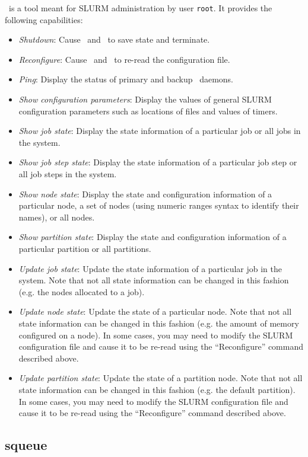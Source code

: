 \documentclass[10pt,onecolumn,times]{../common/llncs}
\begin{document}
{\scontrol\ is a tool meant for SLURM administration by user {\tt root}. 
It provides the following capabilities:
\begin{itemize}
\item {\em Shutdown}: Cause \slurmctld\ and \slurmd\ to save state 
and terminate.
\item {\em Reconfigure}: Cause \slurmctld\ and \slurmd\ to re-read the 
configuration file.
\item {\em Ping}: Display the status of primary and backup \slurmctld\ daemons.
\item {\em Show configuration parameters}: Display the values of general SLURM 
configuration parameters such as locations of files and values of timers.  
\item {\em Show job state}: Display the state information of a particular job 
or all jobs in the system.
\item {\em Show job step state}: Display the state information of a particular 
job step or all job steps in the system.
\item {\em Show node state}: Display the state and configuration information 
of a particular node, a set of nodes (using numeric ranges syntax to 
identify their names), or all nodes.
\item {\em Show partition state}: Display the state and configuration 
information of a particular partition or all partitions.
\item {\em Update job state}: Update the state information of a particular job 
in the system. Note that not all state information can be changed in this 
fashion (e.g. the nodes allocated to a job).
\item {\em Update node state}: Update the state of a particular node. Note
that not all state information can be changed in this fashion (e.g. the
amount of memory configured on a node). In some cases, you may need
to modify the SLURM configuration file and cause it to be re-read
using the ``Reconfigure'' command described above.  
\item {\em Update partition state}: Update the state of a partition
node. Note that not all state information can be changed in this fashion
(e.g. the default partition). In some cases, you may need to modify
the SLURM configuration file and cause it to be re-read using the
``Reconfigure'' command described above.  \end{itemize}

\subsection{squeue}

}
\end{document}
